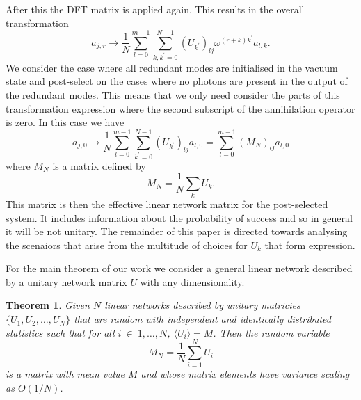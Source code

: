 \documentclass[aps,pra,twocolumn,superscriptaddress,numerical]{revtex4-1}
\newtheorem{theorem}{Theorem}
\begin{document}
After this the DFT matrix is applied again.  This results in the overall transformation
\begin{equation}
	a_{j,r} \rightarrow \frac{1}{N} 
	\sum_{l=0}^{m-1} \sum_{k,k^\prime=0}^{N-1}
	(U_{k^\prime})_{lj} \omega^{(r+k)k^\prime} a_{l,k}.
\end{equation}
We consider the case where all redundant modes are initialised in the vacuum state and post-select on the cases where no photons are present in the output of the redundant modes.  This means that we only need consider the parts of this transformation expression where the second subscript of the annihilation operator is zero.  In this case we have
\begin{equation}
	\label{sum_transformation}
	a_{j,0} \rightarrow \frac{1}{N}\sum_{l=0}^{m-1} \sum_{k^\prime=0}^{N-1}
	(U_{k^\prime})_{lj} a_{l,0} = \sum_{l=0}^{m-1} (M_N)_{lj} a_{l,0}
\end{equation}
where $M_N$ is a matrix defined by
\begin{equation}
	M_N = \frac{1}{N} \sum_k U_k.
\end{equation}
This matrix is then the effective linear network matrix for the post-selected system.  It includes information about the probability of success and so in general it will be not unitary.  The remainder of this paper is directed towards analysing the scenaiors that arise from the multitude of choices for $U_k$ that form expression.

For the main theorem of our work we consider a general linear network described by a unitary network matrix $U$ with any dimensionality. 


\begin{theorem}
\label{Theorem 1}
Given $N$ linear networks described by unitary matricies $\{U_1,U_2,\ldots,U_N\}$ that are random with independent and identically distributed statistics such that for all $i~\in~{1,\ldots,N}$, $\langle U_i \rangle = M$.  Then the random variable 
\begin{equation}
	\label{sum_unitary}
	M_{N}=\frac{1}{N}\sum_{i=1}^{N}U_{i}
\end{equation}
is a matrix with mean value $M$ and whose matrix elements have variance scaling as $O(1/N)$.
\end{theorem}
\end{document}
